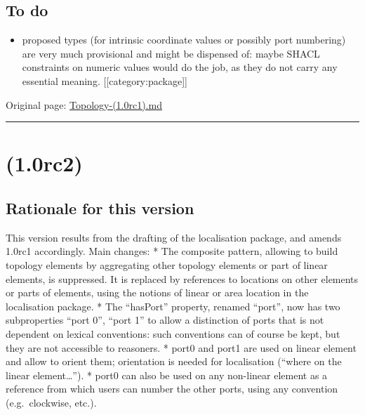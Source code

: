 \documentclass[
  11pt,
]{article}
\providecommand{\tightlist}{%
  \setlength{\itemsep}{0pt}\setlength{\parskip}{0pt}}
\begin{document}
\hypertarget{to-do}{%
\subsection{To do}\label{to-do}}

\begin{itemize}
\tightlist
\item
  proposed types (for intrinsic coordinate values or possibly port
  numbering) are very much provisional and might be dispensed of: maybe
  SHACL constraints on numeric values would do the job, as they do not
  carry any essential meaning. {[}{[}category:package{]}{]}
\end{itemize}

Original page:
\href{https://github.com/UICrail/CDM-RSM/wiki/Topology-\%281.0rc1\%29}{Topology-(1.0rc1).md}

\begin{center}\rule{0.5\linewidth}{0.5pt}\end{center}

\hypertarget{rc2}{%
\section{(1.0rc2)}\label{rc2}}

\hypertarget{rationale-for-this-version}{%
\subsection{Rationale for this
version}\label{rationale-for-this-version}}

This version results from the drafting of the localisation package, and
amends 1.0rc1 accordingly. Main changes: * The composite pattern,
allowing to build topology elements by aggregating other topology
elements or part of linear elements, is suppressed. It is replaced by
references to locations on other elements or parts of elements, using
the notions of linear or area location in the localisation package. *
The ``hasPort'' property, renamed ``port'', now has two subproperties
``port 0'', ``port 1'' to allow a distinction of ports that is not
dependent on lexical conventions: such conventions can of course be
kept, but they are not accessible to reasoners. * port0 and port1 are
used on linear element and allow to orient them; orientation is needed
for localisation (``where on the linear element\ldots{}''). * port0 can
also be used on any non-linear element as a reference from which users
can number the other ports, using any convention (e.g.~clockwise, etc.).
\end{document}
